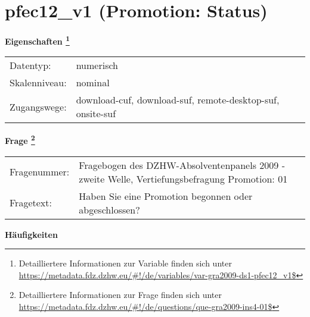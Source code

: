 
    \setcounter{footnote}{0}

    \vspace*{-1.8cm}
	\section{pfec12\_v1 (Promotion: Status)}
	\label{section:pfec12_v1}



    \vspace*{0.5cm}
    \noindent\textbf{Eigenschaften
	\footnote{Detailliertere Informationen zur Variable finden sich unter
		\url{https://metadata.fdz.dzhw.eu/\#!/de/variables/var-gra2009-ds1-pfec12_v1$}}}\\
	\begin{tabularx}{\hsize}{@{}lX}
	Datentyp: & numerisch \\
	Skalenniveau: & nominal \\
	Zugangswege: &
	  download-cuf, 
	  download-suf, 
	  remote-desktop-suf, 
	  onsite-suf
 \\
    \end{tabularx}



				\vspace*{0.5cm}
                \noindent\textbf{Frage
	                \footnote{Detailliertere Informationen zur Frage finden sich unter
		              \url{https://metadata.fdz.dzhw.eu/\#!/de/questions/que-gra2009-ins4-01$}}}\\
				\begin{tabularx}{\hsize}{@{}lX}
					Fragenummer: &
					  Fragebogen des DZHW-Absolventenpanels 2009 - zweite Welle, Vertiefungsbefragung Promotion:
					  01
 \\
					Fragetext: & Haben Sie eine Promotion begonnen oder abgeschlossen? \\
				\end{tabularx}





        		\vspace*{0.5cm}
                \noindent\textbf{Häufigkeiten}

